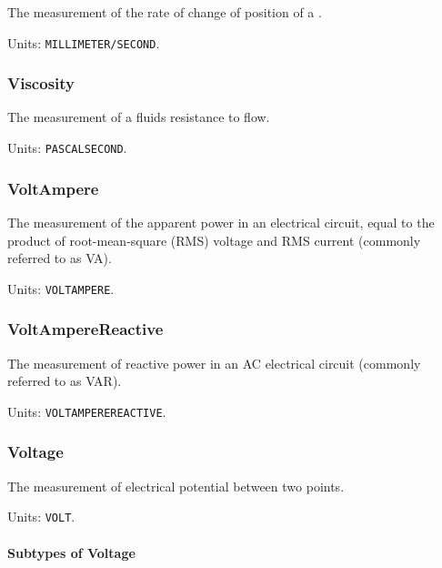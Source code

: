 The measurement of the rate of change of position of a .


Units: \texttt{MILLIMETER/SECOND}.

\subsubsection{Viscosity}
\label{sec:Viscosity}



The measurement of a fluids resistance to flow.


Units: \texttt{PASCAL\textunderscore SECOND}.

\subsubsection{VoltAmpere}
\label{sec:VoltAmpere}



The measurement of the apparent power in an electrical circuit, equal to the product of root-mean-square (RMS) voltage and RMS current (commonly referred to as VA).


Units: \texttt{VOLT\textunderscore AMPERE}.

\subsubsection{VoltAmpereReactive}
\label{sec:VoltAmpereReactive}



The measurement of reactive power in an AC electrical circuit (commonly referred to as VAR).


Units: \texttt{VOLT\textunderscore AMPERE\textunderscore REACTIVE}.

\subsubsection{Voltage}
\label{sec:Voltage}



The measurement of electrical potential between two points.


Units: \texttt{VOLT}.

\paragraph{Subtypes of Voltage}\mbox{}
\label{sec:Subtypes of Voltage}

